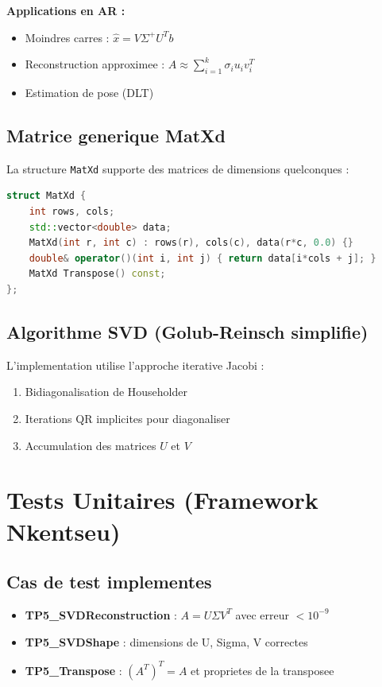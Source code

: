 \documentclass[12pt,a4paper]{article}
\begin{document}
\textbf{Applications en AR :}
\begin{itemize}
    \item Moindres carres : $\hat{x} = V\Sigma^+U^T b$
    \item Reconstruction approximee : $A \approx \sum_{i=1}^{k} \sigma_i u_i v_i^T$
    \item Estimation de pose (DLT)
\end{itemize}

\subsection{Matrice generique MatXd}

La structure \texttt{MatXd} supporte des matrices de dimensions quelconques :

\begin{lstlisting}[language=C++, caption=Structure MatXd]
struct MatXd {
    int rows, cols;
    std::vector<double> data;
    MatXd(int r, int c) : rows(r), cols(c), data(r*c, 0.0) {}
    double& operator()(int i, int j) { return data[i*cols + j]; }
    MatXd Transpose() const;
};
\end{lstlisting}

\subsection{Algorithme SVD (Golub-Reinsch simplifie)}

L'implementation utilise l'approche iterative Jacobi :
\begin{enumerate}
    \item Bidiagonalisation de Householder
    \item Iterations QR implicites pour diagonaliser
    \item Accumulation des matrices $U$ et $V$
\end{enumerate}

\section{Tests Unitaires (Framework Nkentseu)}

\subsection{Cas de test implementes}

\begin{itemize}
    \item \textbf{TP5\_SVDReconstruction} : $A = U\Sigma V^T$ avec erreur $< 10^{-9}$
    \item \textbf{TP5\_SVDShape} : dimensions de U, Sigma, V correctes
    \item \textbf{TP5\_Transpose} : $(A^T)^T = A$ et proprietes de la transposee
\end{itemize}
\end{document}
